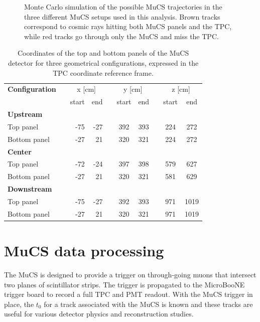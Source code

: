 \documentclass[a4paper]{scrartcl}
\begin{document}
\begin{figure}[htbp]
  \caption{Monte Carlo simulation of the possible MuCS trajectories in the three different MuCS setups used in this analysis. Brown tracks correspond to cosmic rays hitting both MuCS panels and the TPC, while red tracks go through only the MuCS and miss the TPC.} \label{fig:mucs}
\end{figure}

\begin{table}[htbp]
  \centering
  \begin{tabular}{lcrrrccccc}
    \toprule
    \textbf{Configuration} & \phantom{abc}& \multicolumn{2}{c}{x [cm]} & \phantom{abc} & \multicolumn{2}{c}{y [cm]} & \phantom{abc} & \multicolumn{2}{c}{z [cm]}\\
    \cmidrule{3-4} \cmidrule{6-7} \cmidrule{9-10}
    & & start & end & & start & end & & start & end\\
    \midrule

    \textbf{Upstream} & & & & & & & & & \\
    Top panel & & -75 & -27 & & 392 & 393 & & 224 & 272\\
    Bottom panel & & -27 & 21 & & 320 & 321 & & 224 & 272\\

    \midrule
    \textbf{Center} & & & & & & & & & \\
    Top panel & & -72 & -24 & & 397 & 398 & & 579 & 627\\
    Bottom panel & & -27 & 21 & & 320 & 321 & & 581 & 629\\
    \midrule
    \textbf{Downstream} & & & & & & & & & \\
    Top panel & & -75 & -27 & & 392 & 393 & & 971 & 1019\\
    Bottom panel & & -27 & 21 & & 320 & 321 & & 971 & 1019\\
    \bottomrule

  \end{tabular}
  \caption{Coordinates of the top and bottom panels of the MuCS detector for three geometrical configurations, expressed in the TPC coordinate reference frame.}\label{tab:mucs}
\end{table}


\section{MuCS data processing}\label{sec:merging}
The MuCS is designed to provide a trigger on through-going muons that intersect two planes of scintillator strips. The trigger is propagated to the MicroBooNE trigger board to record a full TPC and PMT readout. With the MuCS trigger in place, the $t_0$ for a track associated with the MuCS is known and these tracks are useful for various detector physics and reconstruction studies.
\end{document}
